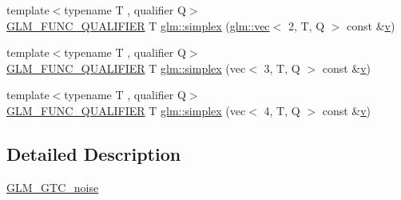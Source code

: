 \begin{DoxyCompactItemize}
\item 
{\footnotesize template$<$typename T , qualifier Q$>$ }\\\mbox{\hyperlink{setup_8hpp_a33fdea6f91c5f834105f7415e2a64407}{G\+L\+M\+\_\+\+F\+U\+N\+C\+\_\+\+Q\+U\+A\+L\+I\+F\+I\+ER}} T \mbox{\hyperlink{namespaceglm_a09cb6ae89b52ee4c47e7b708b84e4d13}{glm\+::simplex}} (\mbox{\hyperlink{structglm_1_1vec}{glm\+::vec}}$<$ 2, T, Q $>$ const \&\mbox{\hyperlink{_s_d_l__opengl_8h_a10a82eabcb59d2fcd74acee063775f90}{v}})
\item 
{\footnotesize template$<$typename T , qualifier Q$>$ }\\\mbox{\hyperlink{setup_8hpp_a33fdea6f91c5f834105f7415e2a64407}{G\+L\+M\+\_\+\+F\+U\+N\+C\+\_\+\+Q\+U\+A\+L\+I\+F\+I\+ER}} T \mbox{\hyperlink{namespaceglm_a9647df123e68432133be68c141dbee4a}{glm\+::simplex}} (vec$<$ 3, T, Q $>$ const \&\mbox{\hyperlink{_s_d_l__opengl_8h_a10a82eabcb59d2fcd74acee063775f90}{v}})
\item 
{\footnotesize template$<$typename T , qualifier Q$>$ }\\\mbox{\hyperlink{setup_8hpp_a33fdea6f91c5f834105f7415e2a64407}{G\+L\+M\+\_\+\+F\+U\+N\+C\+\_\+\+Q\+U\+A\+L\+I\+F\+I\+ER}} T \mbox{\hyperlink{namespaceglm_ab64811bdfcbf5cbd222e3cb50119816a}{glm\+::simplex}} (vec$<$ 4, T, Q $>$ const \&\mbox{\hyperlink{_s_d_l__opengl_8h_a10a82eabcb59d2fcd74acee063775f90}{v}})
\end{DoxyCompactItemize}


\subsection{Detailed Description}
\mbox{\hyperlink{group__gtc__noise}{G\+L\+M\+\_\+\+G\+T\+C\+\_\+noise}} 